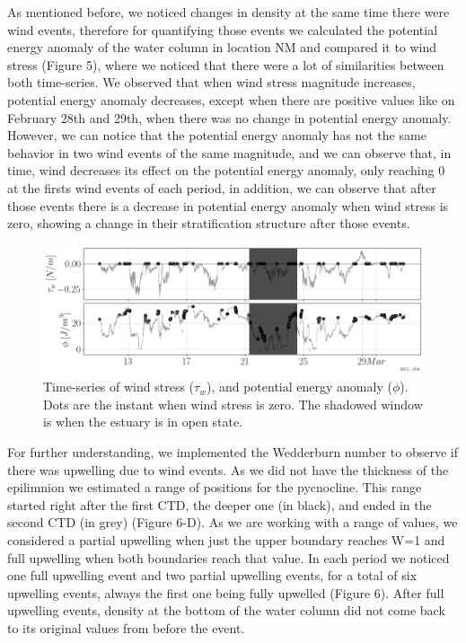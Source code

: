 \documentclass[11pt,letterpaper]{article}
\begin{document}
As mentioned before, we noticed changes in density at the same time there were wind events, therefore for quantifying those events we calculated the potential energy anomaly of the water column in location NM and compared it to wind stress (Figure 5), where we noticed that there were a lot of similarities between both time-series. We observed that when wind stress magnitude increases, potential energy anomaly decreases, except when there are positive values like on February 28th and 29th, when there was no change in potential energy anomaly. However, we can notice that the potential energy anomaly has not the same behavior in two wind events of the same magnitude, and we can observe that, in time, wind decreases its effect on the potential energy anomaly, only reaching 0 at the firsts wind events of each period, in addition, we can observe that after those events there is a decrease in potential energy anomaly when wind stress is zero, showing a change in their stratification structure after those events.

\begin{figure}[h!]
    \centering
    \includegraphics[width=\textwidth]{Imagenes/phi.png}
    \caption{Time-series of wind stress ($\tau_w$), and potential energy anomaly ($\phi$). Dots are the instant when wind stress is zero. The shadowed window is when the estuary is in open state.}
    \label{fig:phi}
\end{figure}

For further understanding, we implemented the Wedderburn number to observe if there was upwelling due to wind events. As we did not have the thickness of the epilimnion we estimated a range of positions for the pycnocline. This range started right after the first CTD, the deeper one (in black), and ended in the second CTD (in grey) (Figure 6-D). As we are working with a range of values, we considered a partial upwelling when just the upper boundary reaches W=1 and full upwelling when both boundaries reach that value. In each period we noticed one full upwelling event and two partial upwelling events, for a total of six upwelling events, always the first one being fully upwelled (Figure 6). After full upwelling events, density at the bottom of the water column did not come back to its original values from before the event. 
\end{document}
